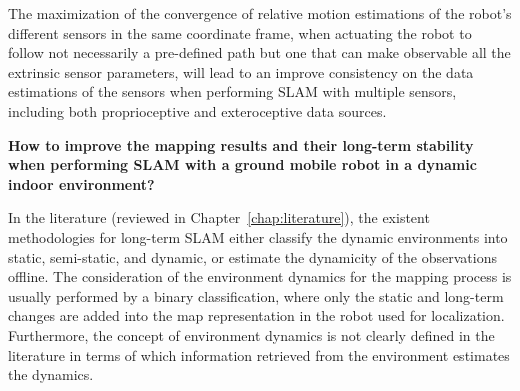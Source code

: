 \begin{hypothesis}\label{hypothesis:calib}
The maximization of the convergence of relative motion estimations of the robot's different sensors in the same coordinate frame, when actuating the robot to follow not necessarily a pre-defined path but one that can make observable all the extrinsic sensor parameters, will lead to an improve consistency on the data estimations of the sensors when performing \gls{SLAM} with multiple sensors, including both proprioceptive and exteroceptive data sources.
\end{hypothesis}




\begin{question}\label{question:mapping}
\textbf{How to improve the mapping results and their long-term stability when performing \gls{SLAM} with a ground mobile robot in a dynamic indoor environment?}
\end{question}

In the literature (reviewed in Chapter~\ref{chap:literature}), the existent methodologies for long-term \gls{SLAM} either classify the dynamic environments into static, semi-static, and dynamic, or estimate the dynamicity of the observations offline.
The consideration of the environment dynamics for the mapping process is usually performed by a binary classification, where only the static and long-term changes are added into the map representation in the robot used for localization.
Furthermore, the concept of environment dynamics is not clearly defined in the literature in terms of which information retrieved from the environment estimates the dynamics. 

